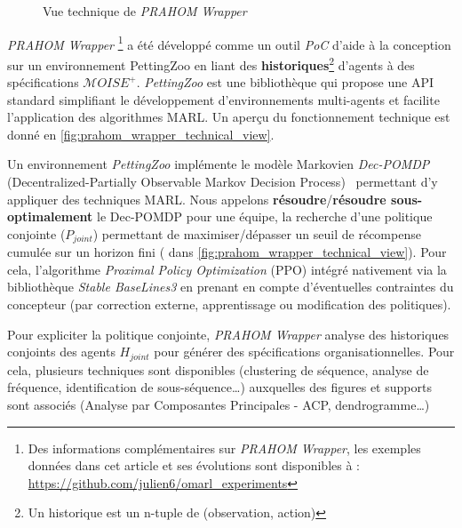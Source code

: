 \documentclass[demonstration]{jfsma}
\newcommand{\jp}[1]{\textbf{\color{red} JPJ: #1}}
\begin{document}
\begin{figure}[h!]
  \centering
  
  \caption{Vue technique de \emph{PRAHOM Wrapper}}
  \label{fig:prahom_wrapper_technical_view}
\end{figure}

\emph{PRAHOM Wrapper}\label{PettingZoo-wrapper}
\footnote{Des informations complémentaires sur \emph{PRAHOM Wrapper}, les exemples données dans cet article et ses évolutions sont disponibles à : \url{https://github.com/julien6/omarl_experiments}}
a été développé comme un outil \emph{PoC} d'aide à la conception sur un environnement PettingZoo en liant des \textbf{historiques}\footnote{Un historique est un n-tuple de (observation, action)} d'agents à des spécifications $\mathcal{M}OISE^+$. \emph{PettingZoo} est une bibliothèque qui propose une API standard simplifiant le développement d'environnements multi-agents et facilite l'application des algorithmes MARL. Un aperçu du fonctionnement technique est donné en \autoref{fig:prahom_wrapper_technical_view}. 

Un environnement
\emph{PettingZoo} implémente le modèle Markovien \emph{Dec-POMDP} (Decentralized-Partially Observable Markov Decision Process)~\cite{Oliehoek2016} permettant d'y appliquer
des techniques MARL. 
Nous appelons \textbf{résoudre}/\textbf{résoudre sous-optimalement} le Dec-POMDP pour une équipe, la recherche d'une politique conjointe ($P_{joint}$) permettant de maximiser/dépasser un seuil de récompense cumulée sur un horizon fini ( dans \autoref{fig:prahom_wrapper_technical_view}). Pour cela, l'algorithme \emph{Proximal Policy Optimization} (PPO) intégré nativement via la bibliothèque \emph{Stable BaseLines3} en prenant en compte d'éventuelles contraintes du concepteur (par correction externe, apprentissage ou modification des politiques).


Pour expliciter la politique conjointe, \emph{PRAHOM Wrapper} analyse des historiques conjoints des agents $H_{joint}$ pour générer des spécifications organisationnelles. Pour cela, plusieurs techniques sont disponibles (clustering de séquence, analyse de fréquence, identification de sous-séquence\dots) auxquelles des figures et supports sont associés (Analyse par Composantes Principales - ACP, dendrogramme\dots)
\end{document}
